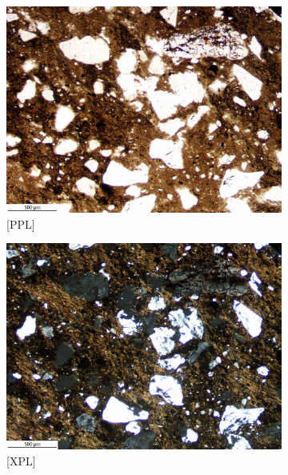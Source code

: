 \documentclass[a4paper]{article}
\begin{document}
\begin{figure}[H]
	\centering
	\begin{subfigure}[t]{.49\textwidth}
		\includegraphics[width=\textwidth]{ThinSections/9-1_4x_PPL.jpg}
		\caption{[PPL]}
	\end{subfigure}\hspace{.5em}\hfill
	\begin{subfigure}[t]{.49\textwidth}
		\includegraphics[width=\textwidth]{ThinSections/9-1_4x_XPL.jpg}
		\caption{[XPL]}
	\end{subfigure}
	\begin{subfigure}[t]{.49\textwidth}

\end{subfigure}
\end{figure}
\end{document}

